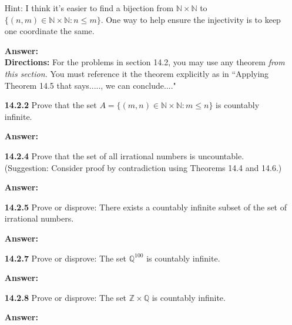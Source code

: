 \documentclass[11pt]{report}
\theoremstyle{plain}
\newcommand{\Z}{\mathbb{Z}}
\newcommand{\Q}{\mathbb{Q}}
\newcommand{\N}{\mathbb{N}}
\begin{document}
\begin{enumerate}
Hint: I think it's easier to find a bijection from $\N \times \N$  to $\{(n,m) \in \N \times \N : n \leq m\}$. One way to help ensure the injectivity is to keep one coordinate the same.

\textbf{Answer:} \\

\vspace{1in}
\textbf{Directions:} For the problems in section 14.2, you may use any theorem \emph{from this section.} You must reference it the theorem explicitly as in ``Applying Theorem 14.5 that says....., we can conclude...."\\

\item[\textbf{14.2.2}] Prove that the set $A =\{(m,n) \in \N \times \N : m \leq  n\}$ is countably infinite.

\textbf{Answer:} \\

\vspace{1in}

\item[\textbf{14.2.4}] Prove that the set of all irrational numbers is uncountable. (Suggestion: Consider proof by contradiction using Theorems 14.4 and 14.6.)

\textbf{Answer:} \\

\vspace{1in}

\item[\textbf{14.2.5}] Prove or disprove: There exists a countably infinite subset of the set of irrational numbers.

\textbf{Answer:} \\

\vspace{1in}

\item[\textbf{14.2.7}] Prove or disprove: The set $\Q^{100}$ is countably infinite.

\textbf{Answer:} \\

\vspace{1in}

\item[\textbf{14.2.8}] Prove or disprove: The set $\Z\times \Q$ is countably infinite.

\textbf{Answer:} \\

\vspace{1in}


\end{enumerate}
\end{document}
